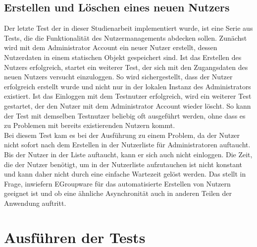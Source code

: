 \subsection*{Erstellen und Löschen eines neuen Nutzers}

Der letzte Test der in dieser Studienarbeit implementiert wurde, ist eine Serie aus Tests, die die Funktionalität des Nutzermanagements abdecken sollen.
Zunächst wird mit dem Administrator Account ein neuer Nutzer erstellt, dessen Nutzerdaten in einem statischen Objekt gespeichert sind.
Ist das Erstellen des Nutzers erfolgreich, startet ein weiterer Test, der sich mit den Zugangsdaten des neuen Nutzers versucht einzuloggen.
So wird sichergestellt, dass der Nutzer erfolgreich erstellt wurde und nicht nur in der lokalen Instanz des Administrators existiert.
Ist das Einloggen mit dem Testnutzer erfolgreich, wird ein weiterer Test gestartet, der den Nutzer mit dem Administrator Account wieder löscht.
So kann der Test mit demselben Testnutzer beliebig oft ausgeführt werden, ohne dass es zu Problemen mit bereits existierenden Nutzern kommt.
\\
Bei diesem Test kam es bei der Ausführung zu einem Problem, da der Nutzer nicht sofort nach dem Erstellen in der Nutzerliste für Administratoren auftaucht.
Bis der Nutzer in der Liste auftaucht, kann er sich auch nicht einloggen.
Die Zeit, die der Nutzer benötigt, um in der Nutzerliste aufzutauchen ist nicht konstant und kann daher nicht durch eine einfache Wartezeit gelöst werden.
Das stellt in Frage, inwiefern EGroupware für das automatisierte Erstellen von Nutzern geeignet ist und ob eine ähnliche Asynchronität auch in anderen Teilen der Anwendung auftritt.


\section{Ausführen der Tests}
